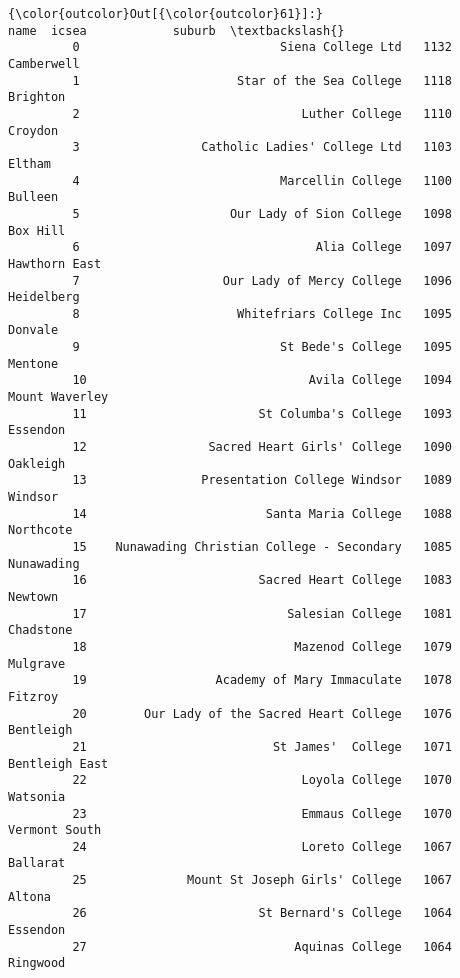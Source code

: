 \documentclass[11pt]{article}
\begin{document}
\begin{Verbatim}[commandchars=\\\{\}]
{\color{outcolor}Out[{\color{outcolor}61}]:}                                           name  icsea            suburb  \textbackslash{}
         0                            Siena College Ltd   1132        Camberwell   
         1                      Star of the Sea College   1118          Brighton   
         2                               Luther College   1110           Croydon   
         3                 Catholic Ladies' College Ltd   1103            Eltham   
         4                            Marcellin College   1100           Bulleen   
         5                     Our Lady of Sion College   1098          Box Hill   
         6                                 Alia College   1097     Hawthorn East   
         7                    Our Lady of Mercy College   1096        Heidelberg   
         8                      Whitefriars College Inc   1095           Donvale   
         9                            St Bede's College   1095           Mentone   
         10                               Avila College   1094    Mount Waverley   
         11                        St Columba's College   1093          Essendon   
         12                 Sacred Heart Girls' College   1090          Oakleigh   
         13                Presentation College Windsor   1089           Windsor   
         14                         Santa Maria College   1088         Northcote   
         15    Nunawading Christian College - Secondary   1085        Nunawading   
         16                        Sacred Heart College   1083           Newtown   
         17                            Salesian College   1081         Chadstone   
         18                             Mazenod College   1079          Mulgrave   
         19                  Academy of Mary Immaculate   1078           Fitzroy   
         20        Our Lady of the Sacred Heart College   1076         Bentleigh   
         21                          St James'  College   1071    Bentleigh East   
         22                              Loyola College   1070          Watsonia   
         23                              Emmaus College   1070     Vermont South   
         24                              Loreto College   1067          Ballarat   
         25              Mount St Joseph Girls' College   1067            Altona   
         26                        St Bernard's College   1064          Essendon   
         27                             Aquinas College   1064          Ringwood   

\end{Verbatim}
\end{document}
